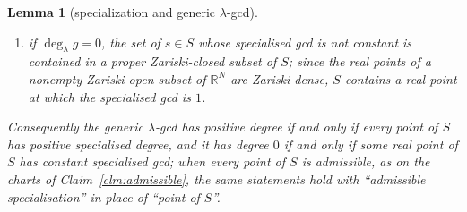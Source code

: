 \documentclass[journal]{IEEEtran}
\theoremstyle{plainn}
\newtheorem{lem}[thm]{Lemma}
\theoremstyle{remark}
\begin{document}
\begin{lem}[specialization and generic $\lambda$-gcd]
\begin{enumerate}[label=(\arabic*),leftmargin=*,itemsep=1pt,topsep=2pt]
\item if $\deg_\lambda g=0$, the set of $s\in S$ whose specialised gcd is not constant is contained in a
proper Zariski-closed subset of $S$; since the real points of a nonempty Zariski-open subset of
$\mathbb R^N$ are Zariski dense, $S$ contains a real point at which the specialised gcd is $1$.
\end{enumerate}
Consequently the generic $\lambda$-gcd has positive degree if and only if every point of $S$ has positive
specialised degree, and it has degree $0$ if and only if some real point of $S$ has constant specialised
gcd; when every point of $S$ is admissible, as on the charts of Claim~\ref{clm:admissible}, the same
statements hold with ``admissible specialisation'' in place of ``point of $S$''.
\end{lem}
\end{document}
